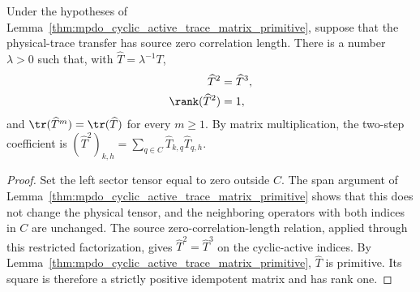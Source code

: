 \begin{lemma}
    \label{thm:mpdo_cyclic_active_zcl_rank_one}
    \leanok
    Under the hypotheses of
    Lemma~\ref{thm:mpdo_cyclic_active_trace_matrix_primitive}, suppose that
    the physical-trace transfer has source zero correlation length. There is
    a number $\lambda>0$ such that, with $\widehat T=\lambda^{-1}T$,
    \begin{align}
        \widehat T^2        & =\widehat T^3,
        \notag                               \\
        \rank(\widehat T^2) & =1,
        \notag
    \end{align}
    and $\tr(\widehat T^m)=\tr(\widehat T)$ for every $m\geq1$.
    By matrix multiplication, the two-step coefficient is
    $(\widehat T^2)_{k,h}=\sum_{q\in C}\widehat T_{k,q}\widehat T_{q,h}$.
\end{lemma}

\begin{proof}\leanok
    Set the left sector tensor equal to zero outside $C$. The span
    argument of Lemma~\ref{thm:mpdo_cyclic_active_trace_matrix_primitive} shows
    that this does not change the physical tensor, and the
    neighboring operators with both indices in $C$ are unchanged. The
    source zero-correlation-length relation, applied through this
    restricted factorization, gives
    $\widehat T^2=\widehat T^3$ on the cyclic-active indices. By
    Lemma~\ref{thm:mpdo_cyclic_active_trace_matrix_primitive},
    $\widehat T$ is primitive. Its square is therefore a strictly positive
    idempotent matrix and has rank one.
\end{proof}

